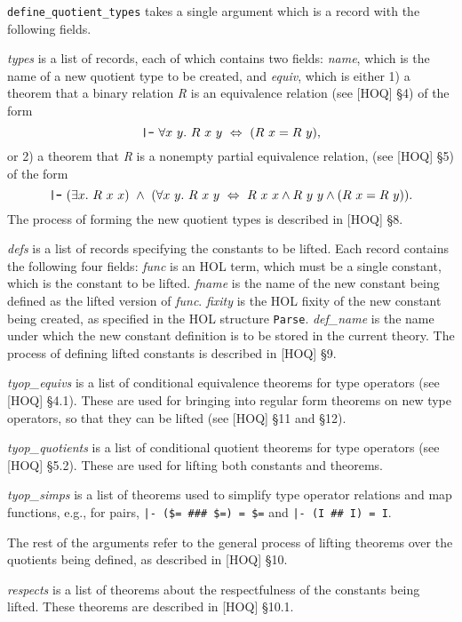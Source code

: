 {\tt define\_quotient\_types} takes a single argument which is a
record with the following fields.

{\it types\/} is a list of records, each of which contains two fields:
{\it name}, which is the name of a new quotient type to be created, and
{\it equiv}, which is
either 1)
a theorem that a binary relation {\it R\/}
is an equivalence relation
(see [HOQ] \S 4)
of the form
$$
\mbox{\tt |-}\
\forall x\ y.\ R\ x\ y \ \Leftrightarrow \
                (R\ x = R\ y),
$$
or 2)
a theorem that {\it R\/} is a nonempty partial equivalence relation,
(see [HOQ] \S 5)
of the form
$$
\mbox{\tt |-}\
(\exists x.\ R\ x\ x) \ \wedge \
(\forall x\ y.\ R\ x\ y \ \Leftrightarrow \
                R\ x\ x \wedge R\ y\ y \wedge (R\ x = R\ y)).
$$
The process of forming the new quotient types is described
in [HOQ] \S 8.

{\it defs\/} is a list of records specifying the constants to be lifted.
Each record contains the following four fields:
{\it func\/} is an HOL term, which must be a single constant, which is the
constant to be lifted.
{\it fname\/} is the name of the new constant being defined as the lifted version of {\it func}.
{\it fixity\/} is the HOL fixity of the new constant being created,
as specified in the HOL structure {\tt Parse}.
{\it def\_name} is the name under which the new constant definition is to
be stored in the current theory.
The
process of defining lifted constants
is described in [HOQ] \S 9.

{\it tyop\_equivs\/} is a list of conditional equivalence theorems
for type operators (see [HOQ] \S 4.1).
These are used for bringing into regular form
theorems on new type operators, so that they can be lifted
(see [HOQ] \S 11 and \S 12).

{\it tyop\_quotients\/} is a list of conditional quotient theorems
for type operators (see [HOQ] \S 5.2).
These are used for lifting both constants and theorems.

{\it tyop\_simps\/} is a list of theorems used to simplify type operator
relations and map functions, e.g.,
for pairs,
{\tt |- (\$= \#\#\# \$=) = \$=} and
{\tt |- (I \#\# I) = I}.

The rest of the arguments refer to the general process of lifting theorems
over the quotients being defined,
as described in [HOQ] \S 10.

{\it respects\/} is a list of theorems about the respectfulness of the
constants being lifted.
These theorems are described in
[HOQ] \S 10.1.

